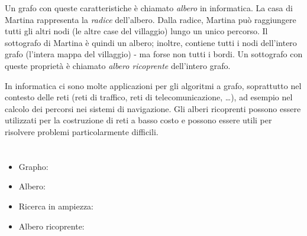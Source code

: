 {{Un grafo con queste caratteristiche è chiamato \emph{albero} in informatica. La casa di Martina rappresenta la \emph{radice} dell’albero. Dalla radice, Martina può raggiungere tutti gli altri nodi (le altre case del villaggio) lungo un unico percorso. Il sottografo di Martina è quindi un albero; inoltre, contiene tutti i nodi dell’intero grafo (l’intera mappa del villaggio) - ma forse non tutti i bordi. Un sottografo con queste proprietà è chiamato \emph{albero ricoprente} dell’intero grafo.

In informatica ci sono molte applicazioni per gli algoritmi a grafo, soprattutto nel contesto delle reti (reti di traffico, reti di telecomunicazione, …), ad esempio nel calcolo dei percorsi nei sistemi di navigazione. Gli alberi ricoprenti possono essere utilizzati per la costruzione di reti a basso costo e possono essere utili per risolvere problemi particolarmente difficili.



\section*{\BrochureWebsitesAndKeywords}
{\raggedright
\begin{itemize}
  \item Grapho: \href{https://it.wikipedia.org/wiki/Grafo}{}
  \item Albero: \href{https://it.wikipedia.org/wiki/Albero_(grafo)}{}
  \item Ricerca in ampiezza: \href{https://it.wikipedia.org/wiki/Ricerca_in_ampiezza}{}
  \item Albero ricoprente: \href{https://it.wikipedia.org/wiki/Albero_ricoprente}{}
\end{itemize}


}

}{}

\def\AuthorGutierrezJ{} %
\def\AuthorLunaC{} %
\def\AuthorSchluterK{} %
\def\AuthorSerafiniG{} %
\def\AuthorIkramovA{} %
\def\AuthorDatzkoThutS{} %
\def\AuthorGiangC{} %

\newpage}{}
